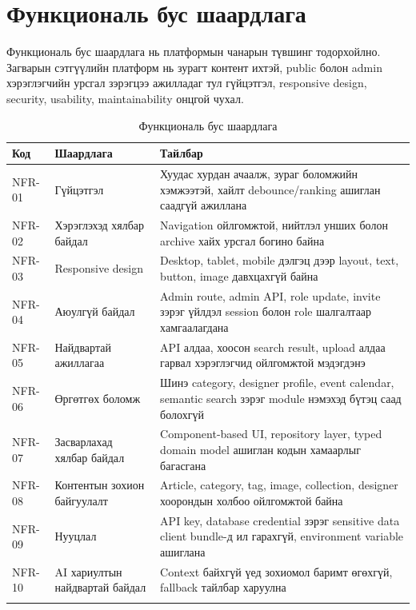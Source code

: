 \section{Функциональ бус шаардлага}
Функциональ бус шаардлага нь платформын чанарын түвшинг тодорхойлно. Загварын сэтгүүлийн платформ нь зурагт контент ихтэй, public болон admin хэрэглэгчийн урсгал зэрэгцээ ажилладаг тул гүйцэтгэл, responsive design, security, usability, maintainability онцгой чухал.

\begin{longtable}{|L{0.10\textwidth}|L{0.24\textwidth}|L{0.48\textwidth}|}
  \hline
  \textbf{Код} & \textbf{Шаардлага} & \textbf{Тайлбар} \\ \hline
  NFR-01 & Гүйцэтгэл & Хуудас хурдан ачаалж, зураг боломжийн хэмжээтэй, хайлт debounce/ranking ашиглан саадгүй ажиллана \\ \hline
  NFR-02 & Хэрэглэхэд хялбар байдал & Navigation ойлгомжтой, нийтлэл унших болон archive хайх урсгал богино байна \\ \hline
  NFR-03 & Responsive design & Desktop, tablet, mobile дэлгэц дээр layout, text, button, image давхцахгүй байна \\ \hline
  NFR-04 & Аюулгүй байдал & Admin route, admin API, role update, invite зэрэг үйлдэл session болон role шалгалтаар хамгаалагдана \\ \hline
  NFR-05 & Найдвартай ажиллагаа & API алдаа, хоосон search result, upload алдаа гарвал хэрэглэгчид ойлгомжтой мэдэгдэнэ \\ \hline
  NFR-06 & Өргөтгөх боломж & Шинэ category, designer profile, event calendar, semantic search зэрэг module нэмэхэд бүтэц саад болохгүй \\ \hline
  NFR-07 & Засварлахад хялбар байдал & Component-based UI, repository layer, typed domain model ашиглан кодын хамаарлыг багасгана \\ \hline
  NFR-08 & Контентын зохион байгуулалт & Article, category, tag, image, collection, designer хоорондын холбоо ойлгомжтой байна \\ \hline
  NFR-09 & Нууцлал & API key, database credential зэрэг sensitive data client bundle-д ил гарахгүй, environment variable ашиглана \\ \hline
  NFR-10 & AI хариултын найдвартай байдал & Context байхгүй үед зохиомол баримт өгөхгүй, fallback тайлбар харуулна \\ \hline
  \caption{Функциональ бус шаардлага}
  \label{tab:nonfunctional-requirements-ch2}\\
\end{longtable}

